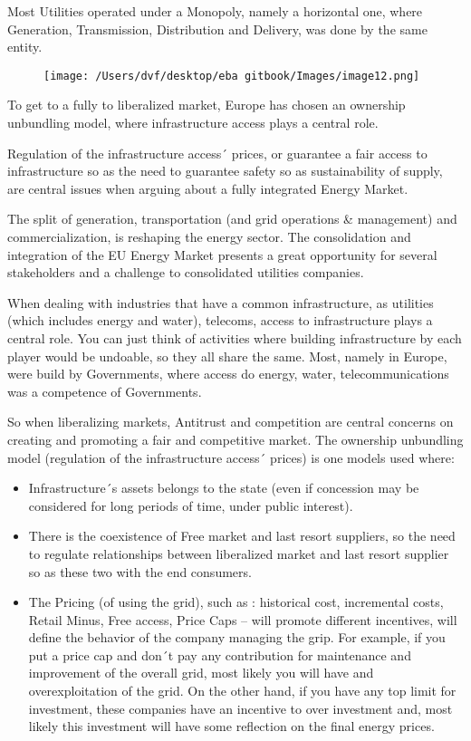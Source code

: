 \documentclass[]{book}
\theoremstyle{definition}
\theoremstyle{definition}
\theoremstyle{definition}
\theoremstyle{remark}
\begin{document}
Most Utilities operated under a Monopoly, namely a horizontal one, where
Generation, Transmission, Distribution and Delivery, was done by the
same entity.

\begin{figure}[htbp]
\centering
\texttt{[image: /Users/dvf/desktop/eba gitbook/Images/image12.png]}
\caption{}
\end{figure}

To get to a fully to liberalized market, Europe has chosen an ownership
unbundling model, where infrastructure access plays a central role.

Regulation of the infrastructure access´ prices, or guarantee a fair
access to infrastructure so as the need to guarantee safety so as
sustainability of supply, are central issues when arguing about a fully
integrated Energy Market.

The split of generation, transportation (and grid operations \&
management) and commercialization, is reshaping the energy sector. The
consolidation and integration of the EU Energy Market presents a great
opportunity for several stakeholders and a challenge to consolidated
utilities companies.

When dealing with industries that have a common infrastructure, as
utilities (which includes energy and water), telecoms, access to
infrastructure plays a central role. You can just think of activities
where building infrastructure by each player would be undoable, so they
all share the same. Most, namely in Europe, were build by Governments,
where access do energy, water, telecommunications was a competence of
Governments.

So when liberalizing markets, Antitrust and competition are central
concerns on creating and promoting a fair and competitive market. The
ownership unbundling model (regulation of the infrastructure access´
prices) is one models used where:

\begin{itemize}
\item
  Infrastructure´s assets belongs to the state (even if concession may
  be considered for long periods of time, under public interest).
\item
  There is the coexistence of Free market and last resort suppliers, so
  the need to regulate relationships between liberalized market and last
  resort supplier so as these two with the end consumers.
\item
  The Pricing (of using the grid), such as : historical cost,
  incremental costs, Retail Minus, Free access, Price Caps -- will
  promote different incentives, will define the behavior of the company
  managing the grip. For example, if you put a price cap and don´t pay
  any contribution for maintenance and improvement of the overall grid,
  most likely you will have and overexploitation of the grid. On the
  other hand, if you have any top limit for investment, these companies
  have an incentive to over investment and, most likely this investment
  will have some reflection on the final energy prices.
\end{itemize}
\end{document}
